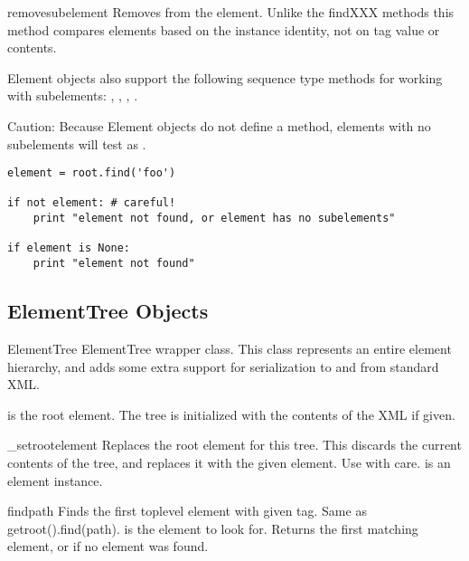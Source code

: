 \begin{methoddesc}{remove}{subelement}
Removes  from the element.  
Unlike the findXXX methods this method compares elements based on 
the instance identity, not on tag value or contents.
\end{methoddesc}

Element objects also support the following sequence type methods for
working with subelements: ,
, , .

Caution: Because Element objects do not define a
 method, elements with no subelements will test
as .

\begin{verbatim}
element = root.find('foo')

if not element: # careful!
    print "element not found, or element has no subelements"

if element is None:
    print "element not found"
\end{verbatim}


\subsection{ElementTree Objects\label{elementtree-elementtree-objects}}

\begin{classdesc}{ElementTree}{ }
ElementTree wrapper class.  This class represents an entire element
hierarchy, and adds some extra support for serialization to and from
standard XML.

 is the root element.
The tree is initialized with the contents of the XML  if given.
\end{classdesc}

\begin{methoddesc}{_setroot}{element}
Replaces the root element for this tree.  This discards the
current contents of the tree, and replaces it with the given
element.  Use with care.
 is an element instance.
\end{methoddesc}

\begin{methoddesc}{find}{path}
Finds the first toplevel element with given tag.
Same as getroot().find(path).
 is the element to look for.
Returns the first matching element, or  if no element was found.
\end{methoddesc}

